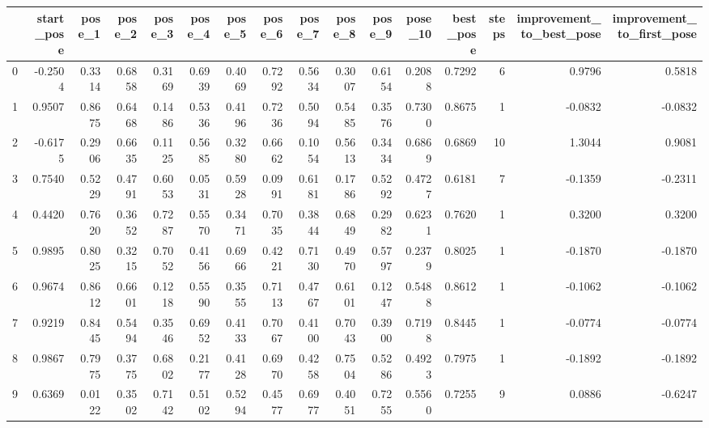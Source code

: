 \begin{tabular}{lrrrrrrrrrrrrrrr}
\toprule
{} &  start\_pose &  pose\_1 &  pose\_2 &  pose\_3 &  pose\_4 &  pose\_5 &  pose\_6 &  pose\_7 &  pose\_8 &  pose\_9 &  pose\_10 &  best\_pose &  steps &  improvement\_to\_best\_pose &  improvement\_to\_first\_pose \\
\midrule
0   &     -0.2504 &  0.3314 &  0.6858 &  0.3169 &  0.6939 &  0.4069 &  0.7292 &  0.5634 &  0.3007 &  0.6154 &   0.2088 &     0.7292 &      6 &                    0.9796 &                     0.5818 \\
1   &      0.9507 &  0.8675 &  0.6468 &  0.1486 &  0.5336 &  0.4196 &  0.7236 &  0.5094 &  0.5485 &  0.3576 &   0.7300 &     0.8675 &      1 &                   -0.0832 &                    -0.0832 \\
2   &     -0.6175 &  0.2906 &  0.6635 &  0.1125 &  0.5685 &  0.3280 &  0.6662 &  0.1054 &  0.5613 &  0.3434 &   0.6869 &     0.6869 &     10 &                    1.3044 &                     0.9081 \\
3   &      0.7540 &  0.5229 &  0.4791 &  0.6053 &  0.0531 &  0.5928 &  0.0991 &  0.6181 &  0.1786 &  0.5292 &   0.4727 &     0.6181 &      7 &                   -0.1359 &                    -0.2311 \\
4   &      0.4420 &  0.7620 &  0.3652 &  0.7287 &  0.5570 &  0.3471 &  0.7035 &  0.3844 &  0.6849 &  0.2982 &   0.6231 &     0.7620 &      1 &                    0.3200 &                     0.3200 \\
5   &      0.9895 &  0.8025 &  0.3215 &  0.7052 &  0.4156 &  0.6966 &  0.4221 &  0.7130 &  0.4970 &  0.5797 &   0.2379 &     0.8025 &      1 &                   -0.1870 &                    -0.1870 \\
6   &      0.9674 &  0.8612 &  0.6601 &  0.1218 &  0.5590 &  0.3555 &  0.7113 &  0.4767 &  0.6101 &  0.1247 &   0.5488 &     0.8612 &      1 &                   -0.1062 &                    -0.1062 \\
7   &      0.9219 &  0.8445 &  0.5494 &  0.3546 &  0.6952 &  0.4133 &  0.7067 &  0.4100 &  0.7043 &  0.3900 &   0.7198 &     0.8445 &      1 &                   -0.0774 &                    -0.0774 \\
8   &      0.9867 &  0.7975 &  0.3775 &  0.6802 &  0.2177 &  0.4128 &  0.6970 &  0.4258 &  0.7504 &  0.5286 &   0.4923 &     0.7975 &      1 &                   -0.1892 &                    -0.1892 \\
9   &      0.6369 &  0.0122 &  0.3502 &  0.7142 &  0.5102 &  0.5294 &  0.4577 &  0.6977 &  0.4051 &  0.7255 &   0.5560 &     0.7255 &      9 &                    0.0886 &                    -0.6247 \\

\end{tabular}
